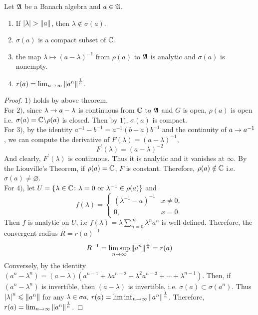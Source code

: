 \begin{thm}
	Let $\mathfrak{A}$ be a Banach algebra and $a \in \mathfrak{A}$.
	\begin{enumerate}[label=\arabic*)]
		\item If $\left\lvert\lambda\right\lvert > \left\lVert a\right\lVert$, then $\lambda \notin \sigma(a)$.
		\item $\sigma(a)$ is a compact subset of $\mathbb{C}$.
		\item the map $\lambda \mapsto (a-\lambda)^{-1}$ from $\rho(a)$ to $\mathfrak{A}$ is analytic and $\sigma(a)$ is nonempty.
		\item $r(a)=\lim_{n \rightarrow \infty} \left\lVert a^{n}\right\lVert^{\frac{1}{n}}$.
	\end{enumerate}
\end{thm}
\begin{proof}
	$1)$ holds by above theorem. \\
	For $2)$, since $\lambda \rightarrow a-\lambda$ is continuous from $\mathbb{C}$ to $\mathfrak{A}$ and $G$ is open, $\rho(a)$ is open i.e. $\sigma(a)=\mathbb{C} \backslash \rho(a)$ is closed. Then by $1)$, $\sigma(a)$ is compact.\\
	For $3)$, by the identity $a^{-1} - b^{-1} = a^{-1}(b-a)b^{-1}$ and the continuity of $a \rightarrow a^{-1}$, we can compute the derivative of $F(\lambda) = (a-\lambda)^{-1}$,
	\begin{equation*}
		F^{'}(\lambda) = (a-\lambda)^{-2}
	\end{equation*}
	And clearly, $F^{'}(\lambda)$ is continuous. Thus it is analytic and it vanishes at $\infty$. By the Liouville's Theorem, if $\rho(a) = \mathbb{C}$, $F$ is constant. Therefore, $\rho(a) \notin \mathbb{C}$ i.e. $\sigma(a) \neq \varnothing$.\\
	For $4)$, let $U=\{\lambda \in \mathbb{C} \colon \lambda = 0 \text{ or } \lambda^{-1} \in \rho(a)\}$ and 
	\begin{equation*}
		f(\lambda) = 
		\begin{cases}
			(\lambda^{-1}-a)^{-1} & x \neq 0,\\
			0,& x = 0
		\end{cases}
	\end{equation*}
	Then $f$ is analytic on $U$, i.e $f(\lambda)=\lambda\sum_{n=0}^{\infty} \lambda^{n} a^{n}$ is well-defined. Therefore, the convergent radius $R = r(a)^{-1}$
	\begin{equation*}
		R^{-1} = \limsup_{n \rightarrow \infty} \left\lVert a^{n}\right\lVert^{\frac{1}{n}} = r(a)
	\end{equation*}
	Conversely, by the identity $(a^{n}-\lambda^{n}) = (a-\lambda)(a^{n-1}+\lambda a^{n-2}+\lambda^{2} a^{n-3} + \cdots + \lambda^{n-1})$. Then, if $(a^{n}-\lambda^{n})$ is invertible, then $(a-\lambda)$ is invertible, i.e. $\sigma(a) \subset \sigma(a^{n})$. Thus $\left\lvert\lambda\right\lvert^{n} \leqslant \left\lVert a^{n}\right\lVert$ for any $\lambda \in \sigma{a}$. $r(a)=\liminf_{n \rightarrow \infty}\left\lVert a^{n}\right\lVert^{\frac{1}{n}}$. Therefore, $r(a)=\lim_{n \rightarrow \infty} \left\lVert a^{n}\right\lVert^{\frac{1}{n}}$.
\end{proof}

